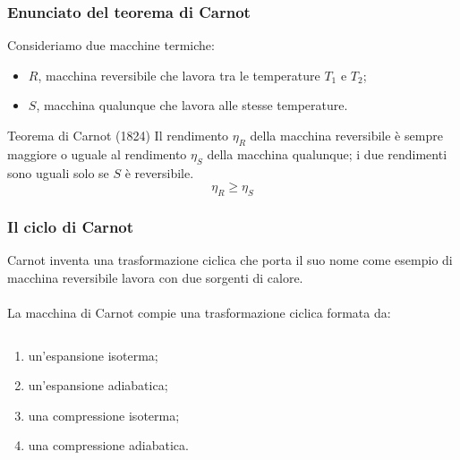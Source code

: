 \documentclass[]{beamer}
\theoremstyle{plain}
\begin{document}
\begin{frame}
  \frametitle{Enunciato del teorema di Carnot}
  Consideriamo due macchine termiche:\pause
  \begin{itemize}
    \item $ R $, macchina reversibile che lavora tra le temperature $ T_1 $ e $ T_2 $;
    \item $ S $, macchina qualunque che lavora alle stesse temperature.\pause
  \end{itemize}
  \begin{block}{Teorema di Carnot (1824)}
    Il rendimento $ \eta_R $ della macchina reversibile è sempre maggiore o uguale al rendimento $ \eta_S $ della macchina qualunque; i due rendimenti sono uguali solo se $ S $ è reversibile.
    \[ \eta_R \geq \eta_S \]
  \end{block}
\end{frame}


\begin{frame}
\frametitle{Il ciclo di Carnot}
{Carnot inventa una trasformazione ciclica che porta il suo nome come esempio di macchina reversibile lavora con due sorgenti di calore.\\~\\}\pause
{La macchina di Carnot compie una trasformazione ciclica formata da:}
\begin{columns}
\begin{column}{0.55\textwidth}
\begin{enumerate}
\item<3-6> un'espansione isoterma;
\item<4-6> un'espansione adiabatica;
\item<5-6> una compressione isoterma;
\item<6> una compressione adiabatica.
\end{enumerate}
\end{column}
\begin{column}{0.3\textwidth}
  \begin{figure}  \centering
\end{figure}
\end{column}
\end{columns}
\end{frame}
\end{document}
